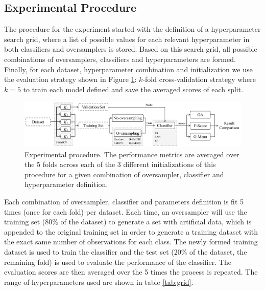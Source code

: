 \documentclass[parskip=full]{scrartcl}
\begin{document}
\subsection{Experimental Procedure}

The procedure for the experiment started with the definition of a
hyperparameter search grid, where a list of possible values for each relevant
hyperparameter in both classifiers and oversamplers is stored. Based on this
search grid, all possible combinations of oversamplers, classifiers and
hyperparameters are formed.  Finally, for each dataset, hyperparameter
combination and initialization we use the evaluation strategy shown in Figure
\ref{fig:experiment_pipeline}: $k$-fold cross-validation strategy where $k=5$
to train each model defined and save the averaged scores of each split.

\begin{figure}[H]
	\centering
	\includegraphics[width=1\linewidth]{../analysis/experiment_pipeline}
	\caption{Experimental procedure. The performance metrics are averaged over
    the 5 folds across each of the 3 different initializations of this procedure
    for a given combination of oversampler, classifier and hyperparameter
    definition.}
	\label{fig:experiment_pipeline}
\end{figure}

Each combination of oversampler, classifier and parameters definition is fit 5
times (once for each fold) per dataset. Each time, an oversampler will use the
training set ($80\%$ of the dataset) to generate a set with artificial data,
which is appended to the original training set in order to generate a training
dataset with the exact same number of observations for each class. The newly
formed training dataset is used to train the classifier and the test set ($20\%$
of the dataset, the remaining fold) is used to evaluate the performance of the
classifier. The evaluation scores are then averaged over the 5 times the process
is repeated. The range of hyperparameters used are shown in table
\ref{tab:grid}.
\end{document}
